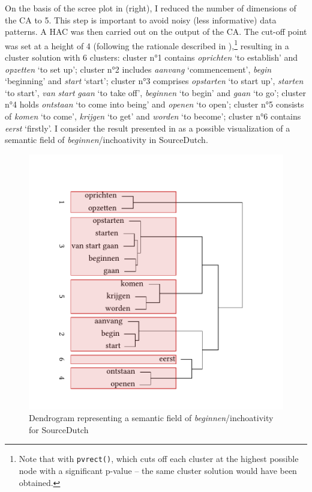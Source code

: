 On the basis of the scree plot in  (right), I reduced the number of dimensions of the CA to 5. This step is important to avoid noisy (less informative) data patterns. A HAC was then carried out on the output of the CA. The cut-off point was set at a height of 4 (following the rationale described in ),\footnote{Note that with \texttt{pvrect()}, which cuts off each cluster at the highest possible node with a significant p-value – the same cluster solution would have been obtained.} resulting in a cluster solution with 6 clusters: cluster n°1 contains \textit{oprichten} `to establish' and \textit{opzetten} `to set up'; cluster n°2 includes \textit{aanvang} `commencement', \textit{begin} `beginning' and \textit{start} `start'; cluster n°3 comprises \textit{opstarten} `to start up', \textit{starten} `to start', \textit{van} \textit{start} \textit{gaan} `to take off', \textit{beginnen} `to begin' and \textit{gaan} `to go'; cluster n°4 holds \textit{ontstaan} `to come into being' and \textit{openen} `to open'; cluster n°5 consists of \textit{komen} `to come', \textit{krijgen} `to get' and \textit{worden} `to become'; cluster n°6 contains \textit{eerst} `firstly'. I consider the result presented in  as a possible visualization of a semantic field of \textit{beginnen}/inchoativity in SourceDutch.

\begin{figure}  
\includegraphics[width=.75\textwidth,trim=0 20 0 50]{figures/tree52.pdf}
\caption{\label{fig:4:52}  Dendrogram representing a semantic field of \textit{beginnen}/inchoativity for SourceDutch}
\end{figure}

